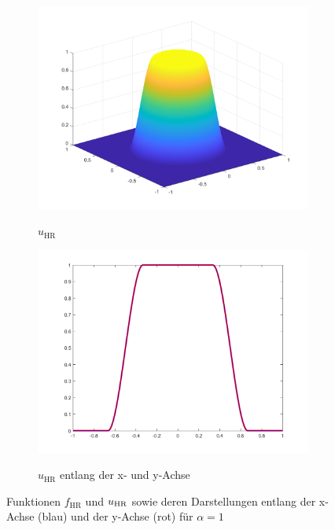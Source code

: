 \begin{figure}[p]
  \begin{subfigure}[b]{.38\linewidth}
    \centering
    \caption{$u_\textrm{HR}$}
    \includegraphics[trim = 40 30 30 30, clip, width=\linewidth]
      {pictures/chapExperiments/secExactSol/f04/exactSolution.png}
    \label{fig:f04ExactSol}
  \end{subfigure}
  \quad
  \begin{subfigure}[b]{.38\linewidth}
    \centering
    \caption{$u_\textrm{HR}$ entlang der x- und y-Achse}
    \includegraphics[trim = 50 30 50 20, clip, width=\linewidth]
      {pictures/chapExperiments/secExactSol/f04/exactSolutionAxis.png}
    \label{fig:f04ExactSolAxis}
  \end{subfigure} 
  \caption{Funktionen $f_\textrm{HR}$ und $u_\textup{HR}$ sowie deren
  Darstellungen entlang der x-Achse (blau) und der y-Achse (rot) für
  $\alpha = 1$}
  \label{fig:f04Plots}
\end{figure}
